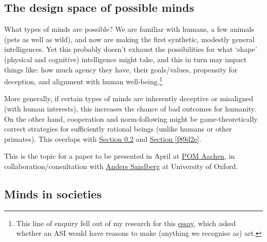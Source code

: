 \documentclass{article}
\begin{document}
\subsection{The design space of possible minds}

\label{025a15}

What types of minds are possible?  We are familiar with humans, a few animals (pets as well as wild), and now are making the first synthetic, modestly general intelligences.  Yet this probably doesn't exhaust the possibilities for what `shape' (physical and cognitive) intelligence might take, and this in turn may impact things like: how much agency they have, their goals/values, propensity for deception, and alignment with human well-being.\footnote{This line of enquiry fell out of my research for this \href{https://wiki.ljudmila.org/Kanad_Chakrabarti:_After_Interregnum,_Indra\%27s_Net}{essay}, which asked whether an ASI would have reasons to make (anything we recognise as) art.  }



More generally, if certain types of minds are inherently deceptive or misaligned (with human interests), this increases the chance of bad outcomes for humanity.  On the other hand, cooperation and norm-following might be game-theoretically correct strategies for sufficiently rational beings (unlike humans or other primates).  This overlaps with \hyperref[f79d3e]{Section \ref*{f79d3e}} and \hyperref[f89d2e]{Section \ref*{f89d2e}}.

This is the topic for a paper to be presented in April at \href{https://www.pomconference.org/pom-aachen-2024/}{POM Aachen}, in collaboration/consultation with \href{https://www.ox.ac.uk/news-and-events/find-an-expert/dr-anders-sandberg}{Anders Sandberg} at University of Oxford.


\subsection{Minds in societies}

\label{f79d3e}
\end{document}
